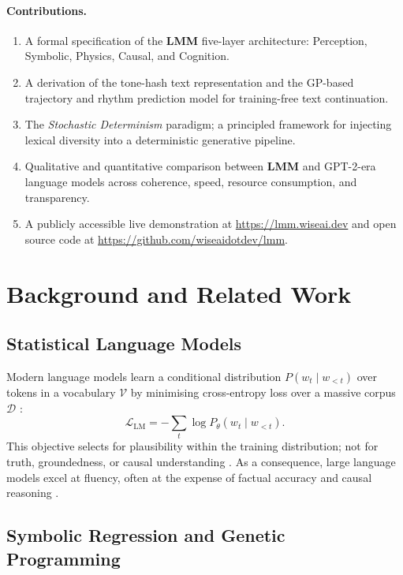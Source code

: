 \documentclass[11pt,a4paper]{article}
\newcommand{\lmm}{\texorpdfstring{%
  \textbf{\color{lmmAccent}LMM}}{LMM}}
\begin{document}
\paragraph{Contributions.}
\begin{enumerate}[noitemsep,topsep=4pt]
  \item A formal specification of the \lmm{} five-layer architecture: Perception, Symbolic, Physics, Causal, and Cognition.
  \item A derivation of the tone-hash text representation and the GP-based trajectory and rhythm prediction model for training-free text continuation.
  \item The \textit{Stochastic Determinism} paradigm; a principled framework for injecting lexical diversity into a deterministic generative pipeline.
  \item Qualitative and quantitative comparison between \lmm{} and GPT-2-era language models across coherence, speed, resource consumption, and transparency.
  \item A publicly accessible live demonstration at \url{https://lmm.wiseai.dev} and open source code at \url{https://github.com/wiseaidotdev/lmm}.
\end{enumerate}

\section{Background and Related Work}
\label{sec:related}

\subsection{Statistical Language Models}

Modern language models learn a conditional distribution $P(w_t \mid w_{<t})$ over tokens in a vocabulary $\mathcal{V}$ by minimising cross-entropy loss over a massive corpus $\mathcal{D}$ \citep{radford2019language}:
\begin{equation}
  \mathcal{L}_{\mathrm{LM}} = -\sum_{t} \log P_\theta(w_t \mid w_{<t}).
  \label{eq:lm_loss}
\end{equation}
This objective selects for plausibility within the training distribution; not for truth, groundedness, or causal understanding \citep{pearl2018book}. As a consequence, large language models excel at fluency, often at the expense of factual accuracy \citep{bang2023multitask} and causal reasoning \citep{kiciman2023causal}.

\subsection{Symbolic Regression and Genetic Programming}
\end{document}
